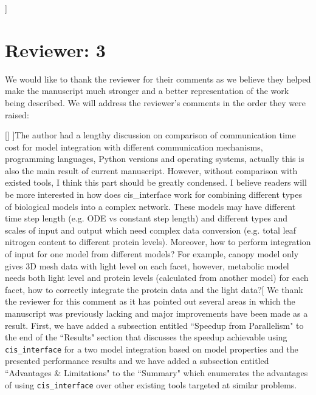 \documentclass[11pt]{article}
\newcommand{\pkg}{{\tt cis\_interface}{}}
\newcommand{\cmark}{\ding{51}}%
\newcommand{\done}{\makebox[0pt][l]{$\square$}{\raisebox{2pt}{\large\hspace{1pt}\cmark}}%
\hspace{-2.5pt}}
\begin{document}
\begin{comments}
]
\end{comments}

\section{Reviewer: 3}

We would like to thank the reviewer for their comments as we believe they helped make the manuscript much stronger and a better representation of the work being described. We will address the reviewer's comments in the order they were raised:
%
\begin{comments}
[]
\comment[\done]{The author had a lengthy discussion on comparison of communication time cost for model integration with different communication mechanisms, programming languages, Python versions and operating systems, actually this is also the main result of current manuscript. However, without comparison with existed tools, I think this part should be greatly condensed. I believe readers will be more interested in how does cis{\_}interface work for combining different types of biological models into a complex network. These models may have different time step length (e.g. ODE vs constant step length) and different types and scales of input and output which need complex data conversion (e.g. total leaf nitrogen content to different protein levels). Moreover, how to perform integration of input for one model from different models? For example, canopy model only gives 3D mesh data with light level on each facet, however, metabolic model needs both light level and protein levels (calculated from another model) for each facet, how to correctly integrate the protein data and the light data?}[%
%
We thank the reviewer for this comment as it has pointed out several areas in which the manuscript was previously lacking and major improvements have been made as a result. First, we have added a subsection entitled ``Speedup from Parallelism" to the end of the ``Results" section that discusses the speedup achievable using {\pkg} for a two model integration based on model properties and the presented performance results and we have added a subsection entitled ``Advantages \& Limitations" to the ``Summary" which enumerates the advantages of using {\pkg} over other existing tools targeted at similar problems.


\end{comments}
\end{document}
